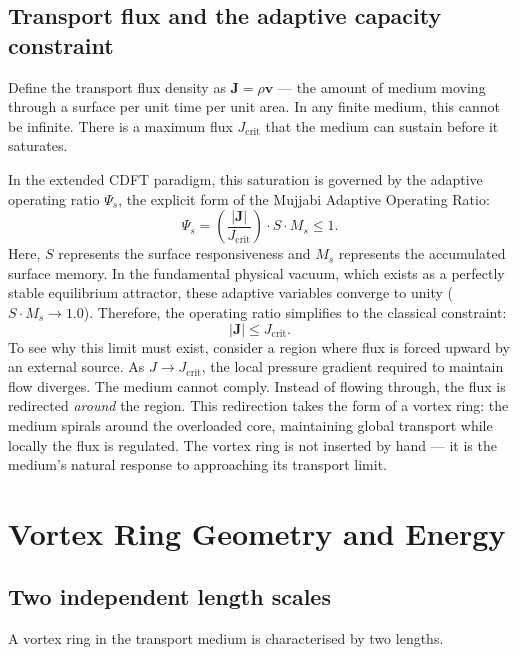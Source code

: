 \documentclass[11pt]{article}
\begin{document}
\subsection{Transport flux and the adaptive capacity constraint}

Define the transport flux density as $\bm{J} = \rho\bm{v}$ --- the amount of
medium moving through a surface per unit time per unit area. In any finite medium,
this cannot be infinite. There is a maximum flux $J_\text{crit}$ that the medium
can sustain before it saturates.

In the extended CDFT paradigm, this saturation is governed by the adaptive operating
ratio $\Psi_s$, the explicit form of the Mujjabi Adaptive Operating Ratio:
\begin{equation}
  \Psi_s = \left(\frac{|\bm{J}|}{J_\text{crit}}\right) \cdot S \cdot M_s \leq 1.
  \label{eq:Psi_s}
\end{equation}
Here, $S$ represents the surface responsiveness and $M_s$ represents the accumulated
surface memory. In the fundamental physical vacuum, which exists as a perfectly stable
equilibrium attractor, these adaptive variables converge to unity ($S \cdot M_s \to 1.0$).
Therefore, the operating ratio simplifies to the classical constraint:
\begin{equation}
  |\bm{J}| \leq J_\text{crit}.
  \label{eq:Jcrit}
\end{equation}
To see why this limit must exist, consider a region where flux is forced upward
by an external source. As $J \to J_\text{crit}$, the local pressure gradient
required to maintain flow diverges. The medium cannot comply. Instead of flowing
through, the flux is redirected \emph{around} the region. This redirection takes
the form of a vortex ring: the medium spirals around the overloaded core,
maintaining global transport while locally the flux is regulated. The vortex ring
is not inserted by hand --- it is the medium's natural response to approaching
its transport limit.


\section{Vortex Ring Geometry and Energy}
\label{sec:geometry}

\subsection{Two independent length scales}

A vortex ring in the transport medium is characterised by two lengths.
\end{document}
